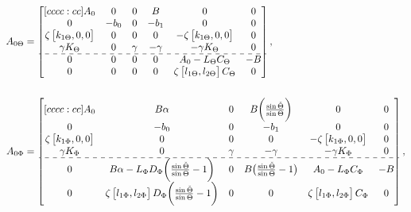 \documentclass[../main.tex]{subfiles}
\begin{document}
	\begin{align*}
		A_{0\Theta} &= 
		\begin{bmatrix}[cccc:cc]
		A_0 & 0 & 0 & B & 0 & 0\\
		0 & -b_0 & 0 & -b_1 & 0 & 0\\
		\zeta \begin{bmatrix}k_{1\Theta} , 0 , 0\end{bmatrix} & 0 & 0 & 0 & -\zeta\begin{bmatrix}k_{1\Theta} , 0 , 0\end{bmatrix} & 0\\
		\gamma K_\Theta & 0 & \gamma & -\gamma & -\gamma K_\Theta & 0\\ \hdashline
		0 & 0 & 0 & 0 & A_0 - L_\Theta C_\Theta & -B\\ 
		0 & 0 & 0 & 0 & \zeta \begin{bmatrix}l_{1\Theta} , l_{2\Theta}	\end{bmatrix} C_\Theta & 0
		\end{bmatrix},\\
		\nonumber \\
		A_{0\Phi} &= 
		\begin{bmatrix}[cccc:cc]
		A_0 & B\alpha & 0 & B\bigg( \frac{\sin \check{\Theta}}{\sin \Theta}\bigg) & 0 & 0\\
		0 & -b_0 & 0 & -b_1 & 0 & 0 \\
		\zeta \begin{bmatrix}k_{1\Phi} , 0 , 0\end{bmatrix} & 0 & 0 & 0 & -\zeta\begin{bmatrix}k_{1\Phi} , 0 , 0\end{bmatrix} & 0 \\
		\gamma K_{\Phi} & 0 & \gamma & -\gamma & -\gamma K_{\Phi} & 0\\ \hdashline
		0 & B\alpha -L_\Phi D_{\Phi}\bigg( \frac{\sin \check{\Theta}}{\sin \Theta} - 1\bigg) & 0 & B\big(\frac{\sin \check{\Theta}}{\sin \Theta} - 1\big) & A_0 - L_\Phi C_{\Phi} & -B \\
		0 & \zeta \begin{bmatrix}l_{1\Phi} , l_{2\Phi}\end{bmatrix} D_\Phi\bigg( \frac{\sin \check{\Theta}}{\sin \Theta} - 1\bigg) & 0 & 0 & \zeta \begin{bmatrix}l_{1\Phi} , l_{2\Phi}\end{bmatrix}C_\Phi & 0
		\end{bmatrix},\nonumber \\
		\nonumber \\

\end{align*}
\end{document}
